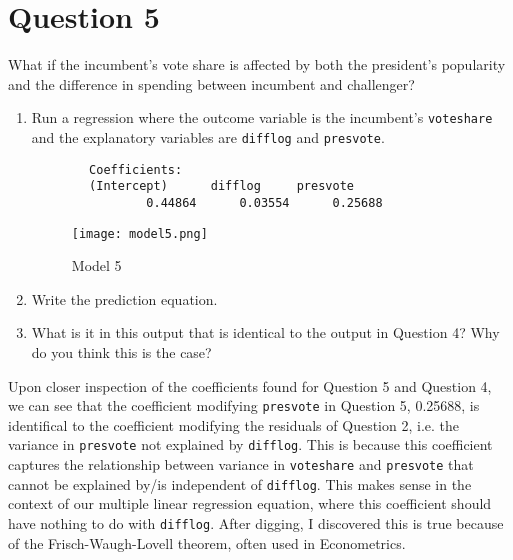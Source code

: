 \documentclass[12pt,letterpaper]{article}
\begin{document}
\section*{Question 5}
\noindent What if the incumbent's vote share is affected by both the president's popularity and the difference in spending between incumbent and challenger? 
	\begin{enumerate}
		\item Run a regression where the outcome variable is the incumbent's \texttt{voteshare} and the explanatory variables are \texttt{difflog} and \texttt{presvote}.	
		 
		\begin{verbatim}
		Coefficients:
		(Intercept)      difflog     presvote  
				0.44864      0.03554      0.25688  
		\end{verbatim}
		\begin{figure}[h!]
			\caption{\footnotesize{Model 5}}
			\vspace{.5cm}
			\centering
			\label{fig:Model 5}			
			\texttt{[image: model5.png]}
		\end{figure}		
		\vspace{5cm}
		\item Write the prediction equation.	
		 
		\vspace{5cm}
		\item What is it in this output that is identical to the output in Question 4? Why do you think this is the case?
		\vspace{1cm}
						
	\end{enumerate}
\vspace{3cm}
		Upon closer inspection of the coefficients found for Question 5 and Question 4, we can see that the coefficient modifying \texttt{presvote} in Question 5, 0.25688, is identifical to the coefficient modifying the residuals of Question 2, i.e. the variance in \texttt{presvote} not explained by \texttt{difflog}. This is because this coefficient captures the relationship between variance in \texttt{voteshare} and \texttt{presvote} that cannot be explained by/is independent of \texttt{difflog}. This makes sense in the context of our multiple linear regression equation, where this coefficient should have nothing to do with \texttt{difflog}.
		After digging, I discovered this is true because of the Frisch-Waugh-Lovell theorem, often used in Econometrics. 
\end{document}
